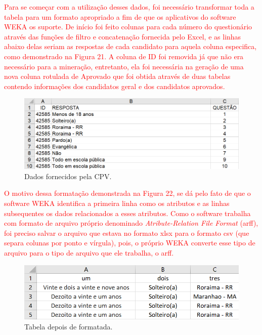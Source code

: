 \par
\textcolor{red}{Para se começar com a utilização desses dados, foi necessário transformar toda a tabela para um formato apropriado a fim de que os aplicativos do software WEKA os suporte. De início foi feito colunas para cada número do questionário através das funções de filtro e concatenação fornecida pelo Excel, e as linhas abaixo delas seriam as respostas de cada candidato para aquela coluna especifica, como demonstrado na Figura 21. A coluna de ID foi removida já que não era necessário para a mineração, entretanto, ela foi necessária na geração de uma nova coluna rotulada de Aprovado que foi obtida através de duas tabelas contendo informações dos candidatos geral e dos candidatos aprovados.}


\par
\begin{figure}[!htp]
	\begin{center}
    \caption{\label{fig:waveform_fig} Dados fornecidos pela CPV.}
	\includegraphics[scale=0.65]{Figuras/Formato_errado.png}
	\end{center}
\end{figure}

\par
\textcolor{red}{O motivo dessa formatação demonstrada na Figura 22, se dá pelo fato de que o software WEKA identifica a primeira linha como os atributos e as linhas subsequentes os dados relacionados a esses atributos. Como o software trabalha com formato de arquivo próprio denominado \textit{Atribute-Relation File Format} (arff), foi preciso salvar o arquivo que estava no formato xlsx para o formato csv (que separa colunas por ponto e vírgula), pois, o próprio WEKA converte esse tipo de arquivo para o tipo de arquivo que ele trabalha, o arff.}

\par
\begin{figure}[!htp]
	\begin{center}
    \caption{\label{fig:waveform_fig} Tabela depois de formatada.}
	\includegraphics[scale=0.65]{Figuras/Formato_certo.png}
	\end{center}
\end{figure}



